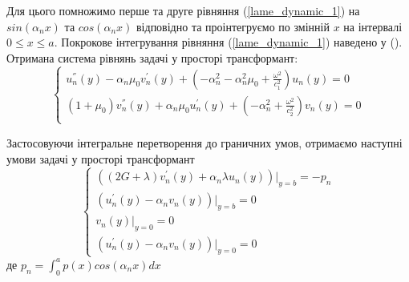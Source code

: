 Для цього помножимо перше та друге рівняння (\ref{lame_dynamic_1}) на $sin(\alpha_n x)$ та $cos(\alpha_n x)$ відповідно та проінтегруємо по змінній $x$ на інтервалі $0 \le x \le a$.
Покрокове інтегрування рівняння (\ref{lame_dynamic_1}) наведено у ().
Отримана система рівнянь задачі у просторі трансформант:
\begin{equation}\label{transf_dynamic_1}
    \begin{cases}
        u_n^{''}(y) - \alpha_n \mu_0 v_n^{'}(y) + (-\alpha_n^2 -\alpha_n^2 \mu_0 + \frac{\omega^2}{c_1^2}) u_n(y) = 0 \\
        (1 + \mu_0) v_n^{''}(y) + \alpha_n \mu_0 u_n^{'}(y) + (- \alpha_n^2 + \frac{\omega^2}{c_2^2}) v_n(y) = 0 \\
    \end{cases}
\end{equation}

Застосовуючи інтегральне перетворення до граничних умов,
отримаємо наступні умови задачі у просторі трансформант
\begin{equation}\label{transf_bound_dynamic_1}
    \begin{cases}
        \left( (2G + \lambda)v_n^{'}(y) + \alpha_n \lambda u_n(y) \right)|_{y=b} = -p_n \\
        \left(u_n^{'}(y) - \alpha_n v_n(y)  \right)|_{y=b} = 0 \\
        v_n(y)|_{y=0} = 0 \\
        \left(u_n^{'}(y) - \alpha_n v_n(y)  \right)|_{y=0} = 0
    \end{cases}
\end{equation}
де $p_n = \int_{0}^{a} p(x) cos(\alpha_n x) dx$

